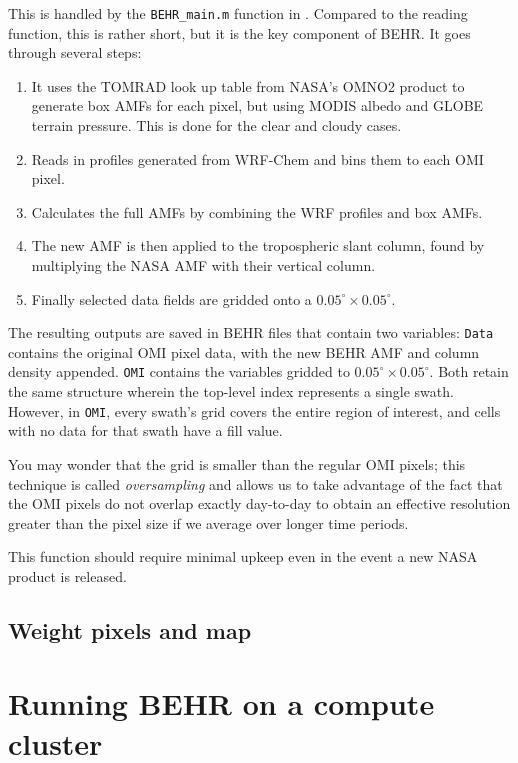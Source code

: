 \documentclass[12pt]{article}
\begin{document}
		This is handled by the \lstinline[breaklines=true]|BEHR_main.m| function in . Compared to the reading function, this is rather short, but it is the key component of BEHR. It goes through several steps:
		\begin{enumerate}
			\item It uses the TOMRAD look up table from NASA's OMNO2 product to generate box AMFs for each pixel, but using MODIS albedo and GLOBE terrain pressure.  This is done for the clear and cloudy cases.
			\item Reads in  profiles generated from WRF-Chem and bins them to each OMI pixel.
			\item Calculates the full AMFs by combining the WRF profiles and box AMFs.
			\item The new AMF is then applied to the tropospheric slant column, found by multiplying the NASA AMF with their vertical column.
			\item Finally selected data fields are gridded onto a $0.05^\circ \times 0.05^\circ$.  
		\end{enumerate}
		
		The resulting outputs are saved in BEHR files that contain two variables: \lstinline[breaklines=true]|Data| contains the original OMI pixel data, with the new BEHR AMF and  column density appended. \lstinline[breaklines=true]|OMI| contains the variables gridded to $0.05^\circ \times 0.05^\circ$. Both retain the same structure wherein the top-level index represents a single swath.  However, in \lstinline[breaklines=true]|OMI|, every swath's grid covers the entire region of interest, and cells with no data for that swath have a fill value.
		
		You may wonder that the grid is smaller than the regular OMI pixels; this technique is called \emph{oversampling} and allows us to take advantage of the fact that the OMI pixels do not overlap exactly day-to-day to obtain an effective resolution greater than the pixel size if we average over longer time periods.
		
		This function should require minimal upkeep even in the event a new NASA product is released.
		
	\subsection{Weight pixels and map}

\section{Running BEHR on a compute cluster} \label{sec:Cluster}
\end{document}
